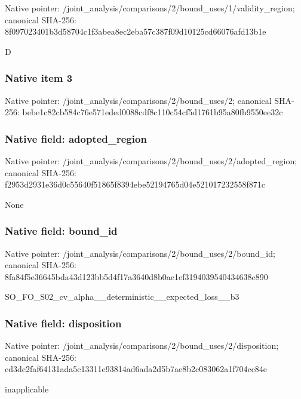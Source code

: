 \documentclass[10pt,a4paper]{article}
\begin{document}
Native pointer: /joint\_analysis/comparis\allowbreak{}ons/2/bound\_uses/1/valid\allowbreak{}ity\_region; canonical SHA-256: 8f097023401b3d58704c1f3a\allowbreak{}bea8ec2eba57c387f09d1012\allowbreak{}5cd66076afd13b1e


D


\subsubsection{Native item 3}


Native pointer: /joint\_analysis/comparis\allowbreak{}ons/2/bound\_uses/2; canonical SHA-256: bebe1c82cb584c76e571eded\allowbreak{}0088cdf8c110c54cf5d1761b\allowbreak{}95a80fb9550ee32c



\subsubsection{Native field: adopted\_region}


Native pointer: /joint\_analysis/comparis\allowbreak{}ons/2/bound\_uses/2/adopt\allowbreak{}ed\_region; canonical SHA-256: f2953d2931e36d0c55640f51\allowbreak{}865f8394ebe52194765d04e5\allowbreak{}21017232558f871c


None


\subsubsection{Native field: bound\_id}


Native pointer: /joint\_analysis/comparis\allowbreak{}ons/2/bound\_uses/2/bound\allowbreak{}\_id; canonical SHA-256: 8fa84f5e36645bda43d123bb\allowbreak{}5d4f17a3640d8b0ae1ef3194\allowbreak{}039540434638c890


SO\_FO\_S02\_cv\_alpha\_\_dete\allowbreak{}rministic\_\_expected\_loss\allowbreak{}\_\_b3


\subsubsection{Native field: disposition}


Native pointer: /joint\_analysis/comparis\allowbreak{}ons/2/bound\_uses/2/dispo\allowbreak{}sition; canonical SHA-256: cd3dc2faf64131ada5c13311\allowbreak{}e93814ad6ada2d5b7ae8b2c0\allowbreak{}83062a1f704cc84e


inapplicable
\end{document}
